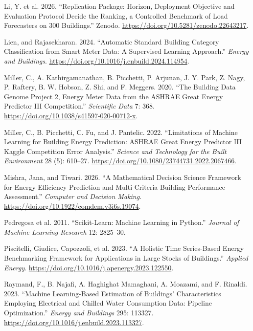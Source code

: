 \documentclass[
  10pt,
]{article}
\newlength{\cslhangindent}
\newlength{\cslentryspacingunit} %
\newenvironment{CSLReferences}[2] %
 {%
  \setlength{\parindent}{0pt}
  \ifodd #1
  \let\oldpar\par
  \def\par{\hangindent=\cslhangindent\oldpar}
  \fi
  \setlength{\parskip}{#2\cslentryspacingunit}
 }%
 {}
\begin{document}
\begin{CSLReferences}{1}{0}
\leavevmode{}%
Li, Y. et al. 2026. {``Replication Package: Horizon, Deployment
Objective and Evaluation Protocol Decide the Ranking, a Controlled
Benchmark of Load Forecasters on 300 Buildings.''} Zenodo.
\url{https://doi.org/10.5281/zenodo.22643217}.

\leavevmode{}%
Lien, and Rajasekharan. 2024. {``Automatic Standard Building Category
Classification from Smart Meter Data: A Supervised Learning Approach.''}
\emph{Energy and Buildings}.
\url{https://doi.org/10.1016/j.enbuild.2024.114954}.

\leavevmode{}%
Miller, C., A. Kathirgamanathan, B. Picchetti, P. Arjunan, J. Y. Park,
Z. Nagy, P. Raftery, B. W. Hobson, Z. Shi, and F. Meggers. 2020. {``The
{Building Data Genome Project 2}, Energy Meter Data from the {ASHRAE
Great Energy Predictor III} Competition.''} \emph{Scientific Data} 7:
368. \url{https://doi.org/10.1038/s41597-020-00712-x}.

\leavevmode{}%
Miller, C., B. Picchetti, C. Fu, and J. Pantelic. 2022. {``Limitations
of Machine Learning for Building Energy Prediction: {ASHRAE Great Energy
Predictor III} {Kaggle} Competition Error Analysis.''} \emph{Science and
Technology for the Built Environment} 28 (5): 610--27.
\url{https://doi.org/10.1080/23744731.2022.2067466}.

\leavevmode{}%
Mishra, Jana, and Tiwari. 2026. {``A Mathematical Decision Science
Framework for Energy-Efficiency Prediction and Multi-Criteria Building
Performance Assessment.''} \emph{Computer and Decision Making}.
\url{https://doi.org/10.1922/comdem.v3i6s.19074}.

\leavevmode{}%
Pedregosa et al. 2011. {``Scikit-Learn: Machine Learning in {Python}.''}
\emph{Journal of Machine Learning Research} 12: 2825--30.

\leavevmode{}%
Piscitelli, Giudice, Capozzoli, et al. 2023. {``A Holistic Time
Series-Based Energy Benchmarking Framework for Applications in Large
Stocks of Buildings.''} \emph{Applied Energy}.
\url{https://doi.org/10.1016/j.apenergy.2023.122550}.

\leavevmode{}%
Raymand, F., B. Najafi, A. Haghighat Mamaghani, A. Moazami, and F.
Rinaldi. 2023. {``Machine Learning-Based Estimation of Buildings'
Characteristics Employing Electrical and Chilled Water Consumption Data:
Pipeline Optimization.''} \emph{Energy and Buildings} 295: 113327.
\url{https://doi.org/10.1016/j.enbuild.2023.113327}.


\end{CSLReferences}
\end{document}
